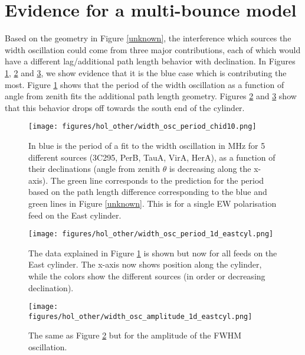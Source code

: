 \section{Evidence for a multi-bounce model}

Based on the geometry in Figure \ref{unknown}, the interference which sources the width oscillation could come from three major contributions, each of which would have a different lag/additional path length behavior with declination. In Figures \ref{feed10}, \ref{widthoscfit} and \ref{amposcfit}, we show evidence that it is the blue case which is contributing the most. Figure \ref{feed10} shows that the period of the width oscillation as a function of angle from zenith fits the additional path length geometry. Figures \ref{widthoscfit} and \ref{amposcfit} show that this behavior drops off towards the south end of the cylinder.
\begin{figure}[h!]
\begin{center}
\texttt{[image: figures/hol\_other/width\_osc\_period\_chid10.png]}
\caption{In blue is the period of a fit to the width oscillation in MHz for 5 different sources (3C295, PerB, TauA, VirA, HerA), as a function of their declinations (angle from zenith $\theta$ is decreasing along the x-axis). The green line corresponds to the prediction for the period based on the path length difference corresponding to the blue and green lines in Figure \ref{unknown}. This is for a single EW polarisation feed on the East cylinder.}
\label{feed10}
\end{center}
\end{figure}

\begin{figure}[h!]
\begin{center}
\texttt{[image: figures/hol\_other/width\_osc\_period\_1d\_eastcyl.png]}
\caption{The data explained in Figure \ref{feed10} is shown but now for all feeds on the East cylinder. The x-axis now shows position along the cylinder, while the colors show the different sources (in order or decreasing declination).}
\label{widthoscfit}
\end{center}
\end{figure}

\begin{figure}[h!]
\begin{center}
\texttt{[image: figures/hol\_other/width\_osc\_amplitude\_1d\_eastcyl.png]}
\caption{The same as Figure \ref{widthoscfit} but for the amplitude of the FWHM oscillation.}
\label{amposcfit}
\end{center}
\end{figure}



